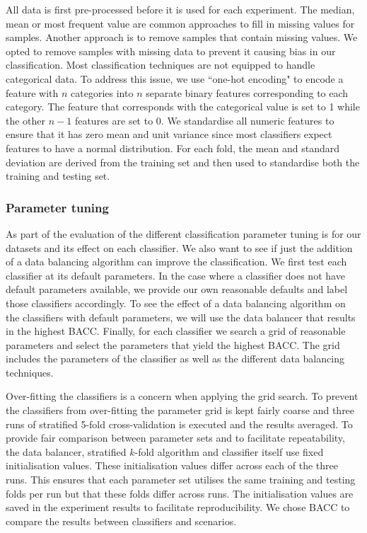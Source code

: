 \documentclass{sig-alternate-05-2015}
\begin{document}
	All data is first pre-processed before it is used for each experiment. The median, mean or most frequent value are common approaches to fill in missing values for samples. Another approach is to remove samples that contain missing values. We opted to remove samples with missing data to prevent it causing bias in our classification. Most classification techniques are not equipped to handle categorical data. To address this issue, we use ``one-hot encoding" to encode a feature with $n$ categories into $n$ separate binary features corresponding to each category. The feature that corresponds with the categorical value is set to 1 while the other $n-1$ features are set to 0. We standardise all numeric features to ensure that it has zero mean and unit variance since most classifiers expect features to have a normal distribution. For each fold, the mean and standard deviation are derived from the training set and then used to standardise both the training and testing set. 

	
	\subsubsection{Parameter tuning}
	\label{parameter_tuning}
	As part of the evaluation of the different classification  parameter tuning is for our datasets and its effect on each classifier. We also want to see if just the addition of a data balancing algorithm can improve the classification. We first test each classifier at its default parameters. In the case where a classifier does not have default parameters available, we provide our own reasonable defaults and label those classifiers accordingly. To see the effect of a data balancing algorithm on the classifiers with default parameters, we will use the data balancer that results in the highest BACC. Finally, for each classifier we search a grid of reasonable parameters and select the parameters that yield the highest BACC. The grid includes the parameters of the classifier as well as the different data balancing techniques.
	
	Over-fitting the classifiers is a concern when applying the grid search. To prevent the classifiers from over-fitting the parameter grid is kept fairly coarse and three runs of stratified 5-fold cross-validation is executed and the results averaged. To provide fair comparison between parameter sets and to facilitate repeatability, the data balancer, stratified $k$-fold algorithm and classifier itself use fixed initialisation values. These initialisation values differ across each of the three runs. This ensures that each parameter set utilises the same training and testing folds per run but that these folds differ across runs. The initialisation values are saved in the experiment results to facilitate reproducibility. We chose BACC to compare the results between classifiers and scenarios.	
	
\end{document}
